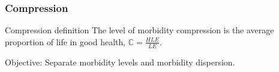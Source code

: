 \documentclass[20pt]{beamer}
\begin{document}
\begin{frame}
\begin{center}
\end{center}
\end{frame}

\begin{frame}
\frametitle{Compression}
\begin{block}{Compression definition}
The level of morbidity compression is the average proportion of life in good
health, $\mathbb{C} = \frac{HLE}{LE}$.
\end{block}


\pause
\begin{block}{Objective:}
Separate morbidity levels and morbidity dispersion.
\end{block}
\end{frame}
\end{document}
